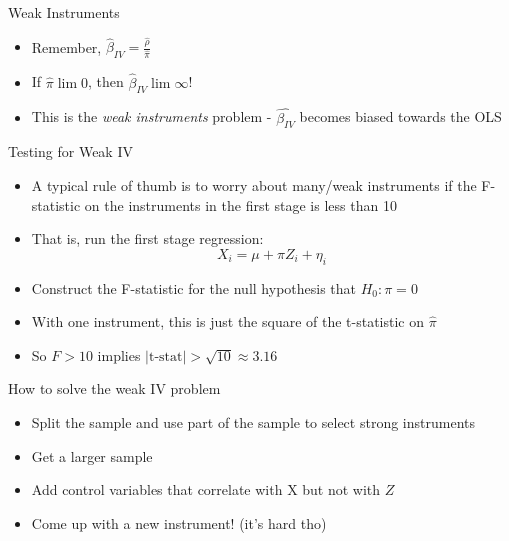 \documentclass[11pt,notes=hide,aspectratio=169,mathserif]{beamer}
\begin{document}
\begin{frame}{Weak Instruments}
\begin{itemize}
\item Remember, $\hat{\beta}_{IV} = \frac{\hat{\rho}}{\hat{\pi}}$
\item If $ \hat{\pi} \lim 0$, then $\hat{\beta}_{IV} \lim \infty$!
\item This is the \textit{weak instruments} problem - $\hat{\beta_{IV}}$ becomes biased towards the OLS
\end{itemize}
\end{frame}
\begin{frame}{Testing for Weak IV}
\begin{itemize}
\item A typical rule of thumb is to worry about many/weak instruments if
the F-statistic on the instruments in the first stage is less than 10
\item That is, run the first stage regression:
\begin{equation*}
X_i = \mu + \pi Z_i + \eta_i
\end{equation*}
\item Construct the F-statistic for the null hypothesis that $H_0: \pi = 0$
\item With one instrument, this is just the square of the t-statistic on $\hat{\pi}$
\item So $F > 10$ implies $|\text{t-stat}| > \sqrt{10} \approx 3.16$
\end{itemize}
\end{frame}

\begin{frame}{How to solve the weak IV problem}
\begin{itemize}
\item Split the sample and use part of the sample to select strong instruments
\item Get a larger sample 
\item Add control variables that correlate with X but not with $Z$
\item Come up with a new instrument! (it's hard tho) 
\end{itemize}
\end{frame}
\end{document}
